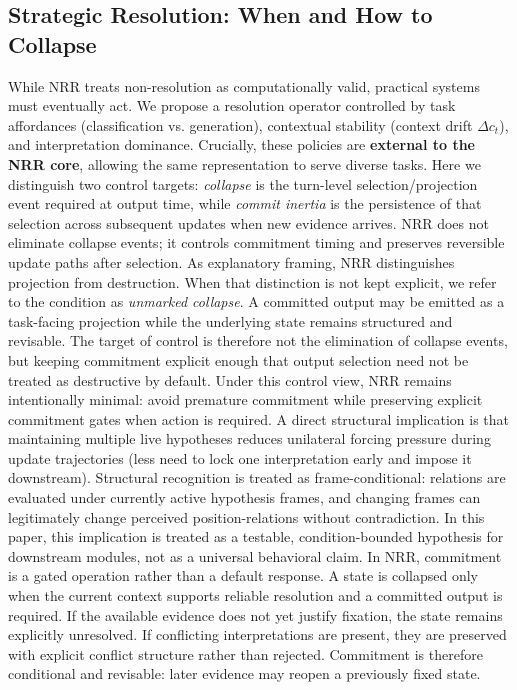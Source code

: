 \documentclass[11pt,a4paper]{article}
\begin{document}
\subsection{Strategic Resolution: When and How to Collapse}

While NRR treats non-resolution as computationally valid, practical systems must eventually act.
We propose a resolution operator controlled by task affordances (classification vs. generation), contextual stability (context drift $\Delta c_t$), and interpretation dominance.
Crucially, these policies are \textbf{external to the NRR core}, allowing the same representation to serve diverse tasks.
Here we distinguish two control targets: \emph{collapse} is the turn-level selection/projection event required at output time, while \emph{commit inertia} is the persistence of that selection across subsequent updates when new evidence arrives. NRR does not eliminate collapse events; it controls commitment timing and preserves reversible update paths after selection.
As explanatory framing, NRR distinguishes projection from destruction.
When that distinction is not kept explicit, we refer to the condition as \emph{unmarked collapse}.
A committed output may be emitted as a task-facing projection while the underlying state remains structured and revisable.
The target of control is therefore not the elimination of collapse events, but keeping commitment explicit enough that output selection need not be treated as destructive by default.
Under this control view, NRR remains intentionally minimal: avoid premature commitment while preserving explicit commitment gates when action is required. A direct structural implication is that maintaining multiple live hypotheses reduces unilateral forcing pressure during update trajectories (less need to lock one interpretation early and impose it downstream). Structural recognition is treated as frame-conditional: relations are evaluated under currently active hypothesis frames, and changing frames can legitimately change perceived position-relations without contradiction. In this paper, this implication is treated as a testable, condition-bounded hypothesis for downstream modules, not as a universal behavioral claim.
In NRR, commitment is a gated operation rather than a default response.
A state is collapsed only when the current context supports reliable resolution and a committed output is required.
If the available evidence does not yet justify fixation, the state remains explicitly unresolved.
If conflicting interpretations are present, they are preserved with explicit conflict structure rather than rejected.
Commitment is therefore conditional and revisable: later evidence may reopen a previously fixed state.
\end{document}

